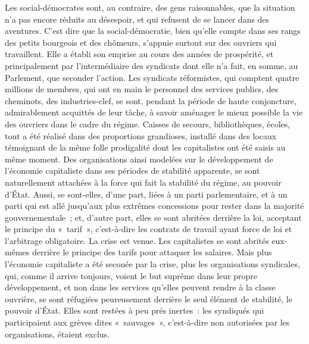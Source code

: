 \documentclass[french,twoside]{book} %
\begin{document}
\noindent Les social-démocrates sont, au contraire, des gens raisonnables, que la situation n'a pas encore réduits au désespoir, et qui refusent de se lancer dans des aventures. C'est dire que la social-démocratie, bien qu'elle compte dans ses rangs des petits bourgeois et des chômeurs, s'appuie surtout sur des ouvriers qui travaillent. Elle a établi son emprise au cours des années de prospérité, et principalement par l'intermédiaire des syndicats dont elle n'a fait, en somme, au Parlement, que seconder l'action. Les syndicats réformistes, qui comptent quatre millions de membres, qui ont en main le personnel des services publics, des cheminots, des industries-clef, se sont, pendant la période de haute conjoncture, admirablement acquittés de leur tâche, à savoir aména­ger le mieux possible la vie des ouvriers dans le cadre du régime. Caisses de secours, bibliothèques, écoles, tout a été réalisé dans des proportions gran­dioses, installé dans des locaux témoignant de la même folle prodigalité dont les capitalistes ont été saisis au même moment. Des organisations ainsi modelées sur le développement de l'économie capitaliste dans ses périodes de stabilité apparente, se sont naturellement attachées à la force qui fait la stabi­lité du régime, au pouvoir d'État. Aussi, se sont-elles, d'une part, liées à un parti parlementaire, et à un parti qui est allé jusqu'aux plus extrêmes conces­sions pour rester dans la majorité gouvernementale ; et, d'autre part, elles se sont abritées derrière la loi, acceptant le principe du « tarif », c'est-à-dire les contrats de travail ayant force de loi et l'arbitrage obligatoire. La crise est venue. Les capitalistes se sont abrités eux-mêmes derrière le principe des tarifs pour attaquer les salaires. Mais plus l'économie capitaliste a été secouée par la crise, plus les organisations syndicales, qui, comme il arrive toujours, voient le but suprême dans leur propre développement, et non dans les servi­ces qu'elles peuvent rendre à la classe ouvrière, se sont réfugiées peureuse­ment derrière le seul élément de stabilité, le pouvoir d'État. Elles sont restées à peu prés inertes : les syndiqués qui participaient aux grèves dites « sauvages », c'est-à-dire non autorisées par les organisations, étaient exclus.\par
\end{document}

